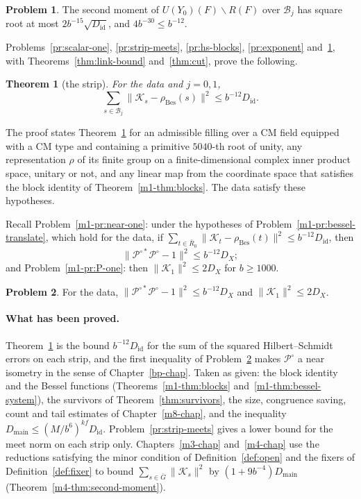 \documentclass[reqno]{amsart}
\newcounter{chap}
\theoremstyle{definition}
\newtheorem{problem}{Problem}[section]
\theoremstyle{plain}
\newtheorem{theorem}{Theorem}[section]
\theoremstyle{remark}
\newcommand{\Kc}{\mathcal K}
\newcommand{\Pc}{\mathcal P}
\newcommand{\Bc}{\mathcal B}
\newcommand{\Gb}{\bar G}
\newcommand{\Rb}{\bar R_0}
\newcommand{\rB}{\rho_{\mathrm{Bes}}}
\newcommand{\Did}{D_{\mathrm{id}}}
\newcommand{\Dmain}{D_{\mathrm{main}}}
\begin{document}
\begin{problem}\label{pr:strip-sum}
The second moment of \(U(Y_0)(F)\smallsetminus R(F)\) over \(\Bc_j\) has square root at most \(2b^{-15}\sqrt{\Did}\), and \(4b^{-30}\le b^{-12}\).
\end{problem}

Problems~\ref{pr:scalar-one}, \ref{pr:strip-meets}, \ref{pr:hs-blocks}, \ref{pr:exponent} and~\ref{pr:strip-sum}, with Theorems~\ref{thm:link-bound} and~\ref{thm:cut}, prove the following.

\begin{theorem}[the strip]\label{thm:strip}
For the data and \(j=0,1\),
\[
 \sum_{s\in\Bc_j}\lVert\Kc_s-\rB(s)\rVert^2\le b^{-12}\Did .
\]
\end{theorem}

\noindent The proof states Theorem~\ref{thm:strip} for an admissible filling over a CM field equipped with a CM type and containing a primitive \(5040\)-th root of unity, any representation \(\rho\) of its finite group on a finite-dimensional complex inner product space, unitary or not, and any linear map from the coordinate space that satisfies the block identity of Theorem~\ref{m1-thm:blocks}.  The data satisfy these hypotheses.

Recall Problem~\ref{m1-pr:near-one}: under the hypotheses of Problem~\ref{m1-pr:bessel-translate}, which hold for the data, if \(\sum_{t\in\Rb}\lVert\Kc_t-\rB(t)\rVert^2\le b^{-12}\Did\), then
\[
 \lVert\Pc^{\circ*}\Pc^\circ-1\rVert^2\le b^{-12}D_X ;
\]
and Problem~\ref{m1-pr:P-one}: then \(\lVert\Kc_1\rVert^2\le2D_X\) for \(b\ge1000\).

\begin{problem}\label{pr:near-one-data}
For the data, \(\lVert\Pc^{\circ*}\Pc^\circ-1\rVert^2\le b^{-12}D_X\) and \(\lVert\Kc_1\rVert^2\le2D_X\).
\end{problem}

\paragraph{What has been proved.}  Theorem~\ref{thm:strip} is the bound \(b^{-12}\Did\) for the sum of the squared Hilbert--Schmidt errors on each strip, and the first inequality of Problem~\ref{pr:near-one-data} makes \(\Pc^\circ\) a near isometry in the sense of Chapter~\ref{bp-chap}.  Taken as given: the block identity and the Bessel functions (Theorems~\ref{m1-thm:blocks} and~\ref{m1-thm:bessel-system}), the survivors of Theorem~\ref{thm:survivors}, the size, congruence saving, count and tail estimates of Chapter~\ref{m8-chap}, and the inequality \(\Dmain\le(M/b^6)^{kf}\Did\).  Problem~\ref{pr:strip-meets} gives a lower bound for the meet norm on each strip only.  Chapters~\ref{m3-chap} and~\ref{m4-chap} use the reductions satisfying the minor condition of Definition~\ref{def:open} and the fixers of Definition~\ref{def:fixer} to bound \(\sum_{s\in\Gb}\lVert\Kc_s\rVert^2\) by \((1+9b^{-4})\Dmain\) (Theorem~\ref{m4-thm:second-moment}).
\end{document}
